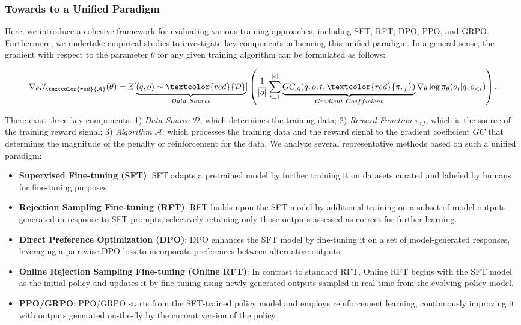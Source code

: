 \begin{itemize}[topsep=0pt]
\subsubsection{Towards to a Unified Paradigm} Here, we introduce a cohesive framework for evaluating various training approaches, including SFT, RFT, DPO, PPO, and GRPO. Furthermore, we undertake empirical studies to investigate key components influencing this unified paradigm. In a general sense, the gradient with respect to the parameter $\theta$ for any given training algorithm can be formulated as follows:

\begin{equation}
    \nabla_{\theta}\mathcal{J}_{\textcolor{red}{\mathcal{A}}}(\theta) = \mathbb{E}[\underbrace{(q,o) \sim \textcolor{red}{\mathcal{D}}}_{Data \ Source}]\left( \frac{1}{|o|} \sum_{t=1}^{|o|}  \underbrace{GC_{{\mathcal{A}}}(q, o, t, \textcolor{red}{\pi_{{rf}}})}_{Gradient \ Coefficient}  \nabla_{\theta}\log \pi_{\theta}(o_t | q, o_{<t})\right).
\label{eq:objective}
\end{equation}

There exist three key components: 1) \textit{Data Source $\mathcal{D}$}, which determines the training data; 2) \textit{Reward Function $\pi_{{rf}}$}, which is the source of the training reward signal; 3) \textit{Algorithm $\mathcal{A}$}: which processes the training data and the reward signal to the gradient coefficient $GC$ that determines the magnitude of the penalty or reinforcement for the data. We analyze several representative methods based on such a unified paradigm:

\begin{itemize}
    \item  \textbf{Supervised Fine-tuning (SFT)}: SFT adapts a pretrained model by further training it on datasets curated and labeled by humans for fine-tuning purposes.
    \item \textbf{Rejection Sampling Fine-tuning (RFT)}: RFT builds upon the SFT model by additional training on a subset of model outputs generated in response to SFT prompts, selectively retaining only those outputs assessed as correct for further learning.
    \item \textbf{Direct Preference Optimization (DPO)}: DPO enhances the SFT model by fine-tuning it on a set of model-generated responses, leveraging a pair-wise DPO loss to incorporate preferences between alternative outputs.
    \item \textbf{Online Rejection Sampling Fine-tuning (Online RFT)}: In contrast to standard RFT, Online RFT begins with the SFT model as the initial policy and updates it by fine-tuning using newly generated outputs sampled in real time from the evolving policy model.
    \item \textbf{PPO/GRPO}: PPO/GRPO starts from the SFT-trained policy model and employs reinforcement learning, continuously improving it with outputs generated on-the-fly by the current version of the policy.
\end{itemize}


\end{itemize}
